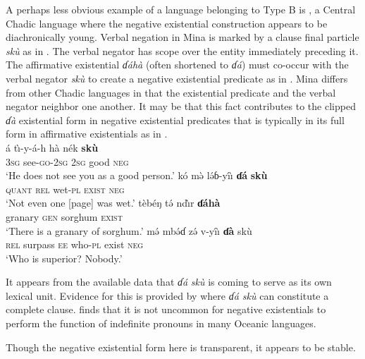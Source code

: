 \documentclass[output=paper]{langsci/langscibook}
\begin{document}
A perhaps less obvious example of a language belonging to Type B is
, a Central Chadic language where the negative existential
construction appears to be diachronically young. Verbal negation in Mina is
marked by a clause final particle \textit{sk\`u} as in .
The verbal negator has scope over the entity immediately preceding it. The
affirmative existential \textit{ɗ\'ah\`a} (often shortened to
\textit{ɗ\'a}) must co-occur with the verbal negator \textit{sk\`u} to
create a negative existential predicate as in . Mina
differs from other Chadic languages in that the existential predicate and
the verbal negator neighbor one another. It may be that this fact
contributes to the clipped \textit{ɗ\`a} existential form in negative existential
predicates that is typically in its full form in affirmative existentials
as in .  
\ea\label{ex:mina-good-wet-granary} 
\\ 
\ea\label{ex:mina-good} 
\gll \'a t{\`\i}-y-\'a-h h\`a n\'ek \textbf{sk\`u}\\ 
3\textsc{sg} see-\textsc{go}-2\textsc{sg} 2\textsc{sg} good \textsc{neg}\\ 
\glt `He does not see you as a good person.' 
\ex\label{ex:mina-wet} 
\gll k\'o m\`ə l\'əɓ-{y\'\i\`\i} \textbf{ɗ\'a} \textbf{sk\`u}\\ 
\textsc{quant} \textsc{rel} wet-\textsc{pl} \textsc{exist} \textsc{neg}\\ 
\glt `Not even one [page] was wet.'
\ex\label{ex:mina-granary}
\gll t\`eb\'eŋ t\'ə nd{\`\i}r \textbf{ɗ\'ah\`a}\\
granary \textsc{gen} sorghum \textsc{exist}\\
\glt `There is a granary of sorghum.' 
\ex\label{ex:mina-superior}
\gll m\'ə mb\'əɗ z\'ə v-{y\'\i\`\i} \textbf{ɗ\`a} sk\`u\\
\textsc{rel} surpass \textsc{ee} who-\textsc{pl} exist \textsc{neg}\\
\glt `Who is superior? Nobody.'
\z\z

It appears from the available data that \textit{ɗ\'a} \textit{sk\`u} is
coming to serve as its own lexical unit. Evidence for this is provided by
 where \textit{ɗ\'a sk\`u} can constitute a complete
clause. \citet{Haspelmath1997} finds that it is not uncommon for negative
existentials to perform the function of indefinite pronouns in many Oceanic
languages.

Though the negative existential form here is transparent, it appears to be
stable. 
\end{document}

